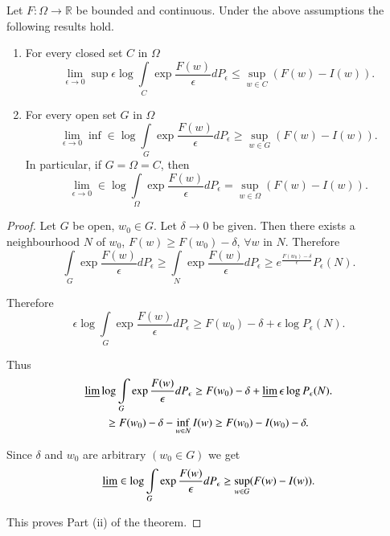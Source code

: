 \begin{theorem*}
Let $F:\Omega\to \mathbb{R}$ be bounded and continuous. Under the
above assumptions the following results hold.
\begin{enumerate}
\renewcommand{\theenumi}{\roman{enumi}}
\renewcommand{\labelenumi}{\rm(\theenumi)}
\item For every closed set $C$ in $\Omega$
$$
\lim\limits_{\epsilon\to 0}\sup \epsilon \log \int\limits_{C}\exp
\frac{F(w)}{\epsilon}dP_{\epsilon}\leq \sup\limits_{w\in C}(F(w)-I(w)).
$$ 

\item For every open set $G$ in $\Omega$
$$
\lim\limits_{\epsilon\to 0}\inf\in \log\int\limits_{G}\exp
\frac{F(w)}{\epsilon}dP_{\epsilon}\geq \sup\limits_{w\in
  G}(F(w)-I(w)).
$$
In particular, if $G=\Omega=C$, then
$$
\lim\limits_{\epsilon\to 0}\in \log \int\limits_{\Omega}\exp
\frac{F(w)}{\epsilon}dP_{\epsilon}=\sup\limits_{w\in
  \Omega}(F(w)-I(w)).
$$
\end{enumerate}
\end{theorem*}

\begin{proof}
Let $G$ be open, $w_{0}\in G$. Let $\delta\to 0$ be given. Then there
exists a neighbourhood $N$ of $w_{0}$, $F(w)\geq F(w_{0})-\delta$,
$\forall w$ in $N$. Therefore
$$
\int\limits_{G}\exp\frac{F(w)}{\epsilon}dP_{\epsilon}\geq
\int\limits_{N}\exp \frac{F(w)}{\epsilon}dP_{\epsilon}\geq
e^{\frac{F(w_{0})-\delta}{\epsilon}}P_{\epsilon}(N). 
$$\pageoriginale

Therefore
$$
\epsilon \log\int\limits_{G}\exp\frac{F(w)}{\epsilon}dP_{\epsilon}\geq
F(w_{0})-\delta+\epsilon \log P_{\epsilon}(N).
$$

Thus
\begin{gather*}
\varliminf \log \int\limits_{G}\exp
\frac{F(w)}{\epsilon}dP_{\epsilon}\geq F(w_{0})-\delta+\varliminf
\epsilon \log P_{\epsilon}(N).\\
\geq F(w_{0})-\delta-\inf\limits_{w\in N}I(w)\geq F(w_{0})-I(w_{0})-\delta.
\end{gather*}

Since $\delta$ and $w_{0}$ are arbitrary $(w_{0}\in G)$ we get
$$
\varliminf \in \log \int\limits_{G}\exp
\frac{F(w)}{\epsilon}dP_{\epsilon}\geq \sup\limits_{w\in
  G}(F(w)-I(w)).
$$

This proves Part (ii) of the theorem.
\end{proof}

